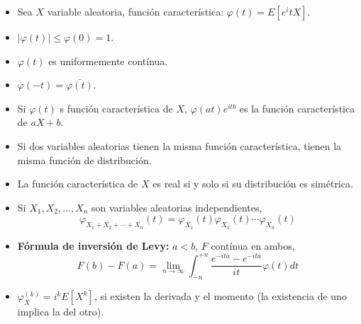 \documentclass[oneside,spanish,a4paper]{article}
\begin{document}
\begin{itemize}
\item Sea $X$ variable aleatoria, funci\'on caracter\'istica: $\varphi(t)=E[e^itX]$.
\item $|\varphi(t)|\leq\varphi(0)=1$.
\item $\varphi(t)$ es uniformemente cont\'inua.
\item $\varphi(-t)=\bar{\varphi(t)}$.
\item Si $\varphi(t)$ s funci\'on caracter\'istica de $X$, $\varphi(at)e^{itb}$ es la funci\'on caracter\'istica de $aX+b$.
\item Si dos variables aleatorias tienen la misma funci\'on caracter\'istica, tienen la misma funci\'on de distribuci\'on.
\item La funci\'on caracter\'istica de $X$ es real si y solo si su distribuci\'on es sim\'etrica.
\item Si $X_1,X_2,\ldots,X_n$ son variables aleatorias independientes,
\[\varphi_{X_1+X_2+\cdots+X_n}(t)=\varphi_{X_1}(t)\varphi_{X_2}(t)\cdots\varphi_{X_n}(t)\]
\item \textbf{F\'ormula de inversi\'on de Levy:} $a<b$, $F$ cont\'inua en ambos,
\[F(b)-F(a)=\lim_{n\to\infty}\int_{-n}^{+n}\dfrac{e^{-ita}-e^{-ita}}{it}\varphi(t)dt\]
\item $\varphi_X^{(k)}=i^kE[X^k]$, si existen la derivada y el momento (la existencia de uno implica la del otro).
\end{itemize}
\end{document}
